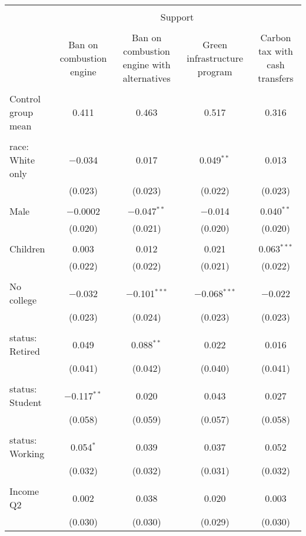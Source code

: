 
\begin{tabular}{@{\extracolsep{5pt}}lcccc} 
\\[-1.8ex]\hline 
\hline \\[-1.8ex] 
 & \multicolumn{4}{c}{Support} \\ 
\cline{2-5} 
\\[-1.8ex] & Ban on combustion engine & Ban on combustion engine with alternatives & Green infrastructure program & Carbon tax with cash transfers \\ 
\hline \\[-1.8ex] 
 Control group mean & 0.411 & 0.463 & 0.517 & 0.316  \\ \hline \\[-1.8ex] race: White only & $-$0.034 & 0.017 & 0.049$^{**}$ & 0.013 \\ 
  & (0.023) & (0.023) & (0.022) & (0.023) \\ 
  & & & & \\ 
 Male & $-$0.0002 & $-$0.047$^{**}$ & $-$0.014 & 0.040$^{**}$ \\ 
  & (0.020) & (0.021) & (0.020) & (0.020) \\ 
  & & & & \\ 
 Children & 0.003 & 0.012 & 0.021 & 0.063$^{***}$ \\ 
  & (0.022) & (0.022) & (0.021) & (0.022) \\ 
  & & & & \\ 
 No college & $-$0.032 & $-$0.101$^{***}$ & $-$0.068$^{***}$ & $-$0.022 \\ 
  & (0.023) & (0.024) & (0.023) & (0.023) \\ 
  & & & & \\ 
 status: Retired & 0.049 & 0.088$^{**}$ & 0.022 & 0.016 \\ 
  & (0.041) & (0.042) & (0.040) & (0.041) \\ 
  & & & & \\ 
 status: Student & $-$0.117$^{**}$ & 0.020 & 0.043 & 0.027 \\ 
  & (0.058) & (0.059) & (0.057) & (0.058) \\ 
  & & & & \\ 
 status: Working & 0.054$^{*}$ & 0.039 & 0.037 & 0.052 \\ 
  & (0.032) & (0.032) & (0.031) & (0.032) \\ 
  & & & & \\ 
 Income Q2 & 0.002 & 0.038 & 0.020 & 0.003 \\ 
  & (0.030) & (0.030) & (0.029) & (0.030) \\ 

\end{tabular}
